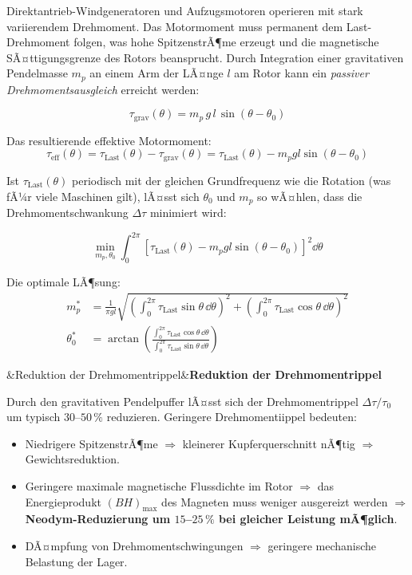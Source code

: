 ﻿\documentclass[12pt, a4paper]{report}
\newenvironment{ergebnis}[1][]{%
  \begin{ergebnisframe}\sloppy%
  \ifx&#1&\else\textbf{#1}\par\smallskip\fi}{\end{ergebnisframe}}
\theoremstyle{definition}
\theoremstyle{remark}
\begin{document}
Direktantrieb-Windgeneratoren und Aufzugsmotoren operieren mit stark
variierendem Drehmoment. Das Motormoment muss permanent dem Last-Drehmoment
folgen, was hohe SpitzenstrÃ¶me erzeugt und die magnetische SÃ¤ttigungsgrenze
des Rotors beansprucht. Durch Integration einer gravitativen Pendelmasse
$m_p$ an einem Arm der LÃ¤nge $l$ am Rotor kann ein \emph{passiver
Drehmomentsausgleich} erreicht werden:

\begin{equation}
  \tau_{\text{grav}}(\theta) = m_p \, g \, l \, \sin(\theta - \theta_0)
  \label{eq:tau_grav_pendel}
\end{equation}

Das resultierende effektive Motormoment:
\begin{equation}
  \tau_{\text{eff}}(\theta) = \tau_{\text{Last}}(\theta) - \tau_{\text{grav}}(\theta)
  = \tau_{\text{Last}}(\theta) - m_p g l \sin(\theta - \theta_0)
  \label{eq:tau_eff}
\end{equation}

Ist $\tau_{\text{Last}}(\theta)$ periodisch mit der gleichen Grundfrequenz wie
die Rotation (was fÃ¼r viele Maschinen gilt), lÃ¤sst sich $\theta_0$ und $m_p$
so wÃ¤hlen, dass die Drehmomentschwankung $\Delta\tau$ minimiert wird:

\begin{equation}
  \min_{m_p, \theta_0}
  \int_0^{2\pi}\!\left[\tau_{\text{Last}}(\theta) - m_p g l\sin(\theta-\theta_0)\right]^2\dd\theta
  \label{eq:optim_pendel}
\end{equation}

Die optimale LÃ¶sung:
\begin{align}
  m_p^* &= \frac{1}{\pi g l}
    \sqrt{\left(\int_0^{2\pi}\!\tau_{\text{Last}}\sin\theta\,\dd\theta\right)^2
         +\left(\int_0^{2\pi}\!\tau_{\text{Last}}\cos\theta\,\dd\theta\right)^2}
  \label{eq:mp_opt} \\
  \theta_0^* &= \arctan\!\left(\frac{\int_0^{2\pi}\!\tau_{\text{Last}}\cos\theta\,\dd\theta}
                                    {\int_0^{2\pi}\!\tau_{\text{Last}}\sin\theta\,\dd\theta}\right)
  \label{eq:theta0_opt}
\end{align}

\begin{ergebnis}[Reduktion der Drehmomentrippel]
  Durch den gravitativen Pendelpuffer lÃ¤sst sich der Drehmomentrippel
  $\Delta\tau / \tau_0$ um typisch $30$--$50\,\%$ reduzieren. Geringere
  Drehmomentiippel bedeuten:
  \begin{itemize}
    \item Niedrigere SpitzenstrÃ¶me $\Rightarrow$ kleinerer Kupferquerschnitt
          nÃ¶tig $\Rightarrow$ Gewichtsreduktion.
    \item Geringere maximale magnetische Flussdichte im Rotor $\Rightarrow$
          das Energieprodukt $(BH)_{\max}$ des Magneten muss weniger ausgereizt
          werden $\Rightarrow$ \textbf{Neodym-Reduzierung um $15$--$25\,\%$
          bei gleicher Leistung mÃ¶glich}.
    \item DÃ¤mpfung von Drehmomentschwingungen $\Rightarrow$ geringere mechanische
          Belastung der Lager.
  \end{itemize}
\end{ergebnis}
\end{document}
